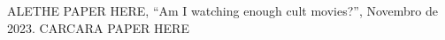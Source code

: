 \documentclass[conference]{IEEEtran}
\begin{document}
\begin{thebibliography}{00}
            ALETHE PAPER HERE, ``Am I watching enough cult movies?'', Novembro de 2023.
           CARCARA PAPER HERE

\end{thebibliography}
\end{document}
